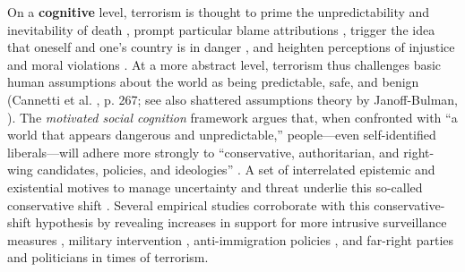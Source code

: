 On a \textbf{cognitive} level, terrorism is thought to prime the unpredictability and inevitability of death \citep{Pyszczynski2003}, prompt particular blame attributions \citep{Kimhi2009a, Sadler2005}, trigger the idea that oneself and one’s country is in danger \citep{Huddy2002, Jost2003}, and heighten perceptions of injustice and moral violations \citep{Lambert2019, Skitka2002}. At a more abstract level, terrorism thus challenges basic human assumptions about the world as being predictable, safe, and benign (Cannetti et al. \citeyear{Canetti2013a}, p. 267; see also shattered assumptions theory by Janoff-Bulman, \citeyear{Janoff-Bulman1992}). The \textit{motivated social cognition} framework argues that, when confronted with ``a world that appears dangerous and unpredictable,'' people---even self-identified liberals---will adhere more strongly to ``conservative, authoritarian, and right-wing candidates, policies, and ideologies'' \citep[][pp. 326-327]{Jost2017a}. A set of interrelated epistemic and existential motives to manage uncertainty and threat underlie this so-called conservative shift \citep{Jost2003, Jost2017a}. Several empirical studies corroborate with this conservative-shift hypothesis by revealing increases in support for more intrusive surveillance measures \citep[e.g.,][]{Davis2004}, military intervention \citep[e.g.,][]{Gadarian2010c, Fisk2019a}, anti-immigration policies \citep[e.g.,][]{Ferwerda2017}, and far-right parties and politicians \citep[e.g.,][]{Vasilopoulos2019c} in times of terrorism.




